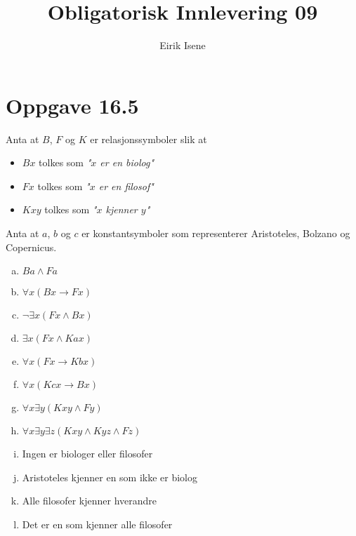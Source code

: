 \documentclass[norsk, 12p]{article}
\title{Obligatorisk Innlevering 09}
\author{Eirik Isene}
\begin{document}
\maketitle

\section{Oppgave 16.5}

Anta at $B$, $F$ og $K$ er relasjonssymboler slik at

\begin{itemize}
\item $Bx$ tolkes som \emph{"$x$ er en biolog"}
\item $Fx$ tolkes som \emph{"$x$ er en filosof"}
\item $Kxy$ tolkes som \emph{"$x$ kjenner $y$"}
\end{itemize}
Anta at $a$, $b$ og $c$ er konstantsymboler som representerer Aristoteles, Bolzano og Copernicus.
\begin{enumerate}[a)]
\item $Ba \land Fa$
\item $\forall x(Bx \to Fx)$
\item $\neg \exists x(Fx \land Bx)$
\item $\exists x(Fx \land Kax)$
\item $\forall x(Fx \to Kbx)$
\item $\forall x(Kcx \to Bx)$
\item $\forall x\exists y(Kxy \land Fy)$
\item $\forall x\exists y\exists z(Kxy \land Kyz \land Fz)$
\item Ingen er biologer eller filosofer
\item Aristoteles kjenner en som ikke er biolog
\item Alle filosofer kjenner hverandre
\item Det er en som kjenner alle filosofer
\end{enumerate}
\end{document}
